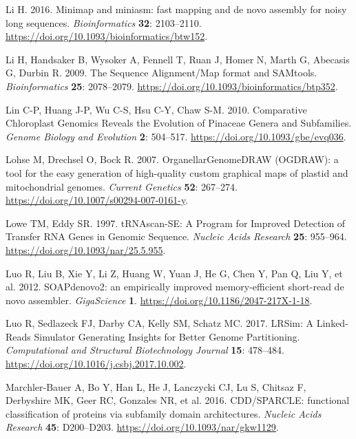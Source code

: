 \documentclass[
  12pt,
  oneside,
  openany]{book}
\begin{document}
\leavevmode\hypertarget{ref-Li_2016}{}%
Li H. 2016. Minimap and miniasm: fast mapping and de novo assembly for noisy long sequences. \emph{Bioinformatics} \textbf{32}: 2103--2110. \url{https://doi.org/10.1093/bioinformatics/btw152}.

\leavevmode\hypertarget{ref-Li_2009}{}%
Li H, Handsaker B, Wysoker A, Fennell T, Ruan J, Homer N, Marth G, Abecasis G, Durbin R. 2009. The Sequence Alignment/Map format and SAMtools. \emph{Bioinformatics} \textbf{25}: 2078--2079. \url{https://doi.org/10.1093/bioinformatics/btp352}.

\leavevmode\hypertarget{ref-Lin_2010}{}%
Lin C-P, Huang J-P, Wu C-S, Hsu C-Y, Chaw S-M. 2010. Comparative Chloroplast Genomics Reveals the Evolution of Pinaceae Genera and Subfamilies. \emph{Genome Biology and Evolution} \textbf{2}: 504--517. \url{https://doi.org/10.1093/gbe/evq036}.

\leavevmode\hypertarget{ref-Lohse_2007}{}%
Lohse M, Drechsel O, Bock R. 2007. OrganellarGenomeDRAW (OGDRAW): a tool for the easy generation of high-quality custom graphical maps of plastid and mitochondrial genomes. \emph{Current Genetics} \textbf{52}: 267--274. \url{https://doi.org/10.1007/s00294-007-0161-y}.

\leavevmode\hypertarget{ref-Lowe_1997}{}%
Lowe TM, Eddy SR. 1997. tRNAscan-SE: A Program for Improved Detection of Transfer RNA Genes in Genomic Sequence. \emph{Nucleic Acids Research} \textbf{25}: 955--964. \url{https://doi.org/10.1093/nar/25.5.955}.

\leavevmode\hypertarget{ref-Luo_2012}{}%
Luo R, Liu B, Xie Y, Li Z, Huang W, Yuan J, He G, Chen Y, Pan Q, Liu Y, et al. 2012. SOAPdenovo2: an empirically improved memory-efficient short-read de novo assembler. \emph{GigaScience} \textbf{1}. \url{https://doi.org/10.1186/2047-217X-1-18}.

\leavevmode\hypertarget{ref-Luo_2017}{}%
Luo R, Sedlazeck FJ, Darby CA, Kelly SM, Schatz MC. 2017. LRSim: A Linked-Reads Simulator Generating Insights for Better Genome Partitioning. \emph{Computational and Structural Biotechnology Journal} \textbf{15}: 478--484. \url{https://doi.org/10.1016/j.csbj.2017.10.002}.

\leavevmode\hypertarget{ref-Marchler_Bauer_2016}{}%
Marchler-Bauer A, Bo Y, Han L, He J, Lanczycki CJ, Lu S, Chitsaz F, Derbyshire MK, Geer RC, Gonzales NR, et al. 2016. CDD/SPARCLE: functional classification of proteins via subfamily domain architectures. \emph{Nucleic Acids Research} \textbf{45}: D200--D203. \url{https://doi.org/10.1093/nar/gkw1129}.
\end{document}
